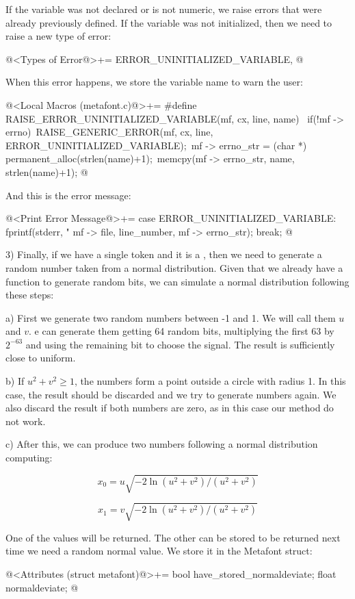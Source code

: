 If the variable was not declared or is not numeric, we raise errors
that were already previously defined. If the variable was not
initialized, then we need to raise a new type of error:

\iniciocodigo
@<Types of Error@>+=
ERROR_UNINITIALIZED_VARIABLE,
@
\fimcodigo

When this error happens, we store the variable name to warn the user:

\iniciocodigo
@<Local Macros (metafont.c)@>+=
#define RAISE_ERROR_UNINITIALIZED_VARIABLE(mf, cx, line, name) {\
  if(!mf -> errno){\
    RAISE_GENERIC_ERROR(mf, cx, line, ERROR_UNINITIALIZED_VARIABLE);\
    mf -> errno_str = (char *) permanent_alloc(strlen(name)+1);\
    memcpy(mf -> errno_str, name, strlen(name)+1);}}
@
\fimcodigo

And this is the error message:

\iniciocodigo
@<Print Error Message@>+=
case ERROR_UNINITIALIZED_VARIABLE:
  fprintf(stderr, "%
          mf -> file, line_number, mf -> errno_str);
  break;
@
\fimcodigo

3) Finally, if we have a single token and it is
a , then we need to generate a random number
taken from a normal distribution. Given that we already have a
function to generate random bits, we can simulate a normal
distribution following these steps:

a) First we generate two random numbers between -1 and 1. We will call
them $u$ and $v$. e can generate them getting 64 random bits,
multiplying the first 63 by $2^{-63}$ and using the remaining bit to
choose the signal. The result is sufficiently close to uniform.

b) If $u^2+v^2\geq 1$, the numbers form a point outside a circle with
radius 1. In this case, the result should be discarded and we try to
generate numbers again. We also discard the result if both numbers are
zero, as in this case our method do not work.

c) After this, we can produce two numbers following a normal
distribution computing:

$$
x_0 = u\sqrt{-2\ln(u^2+v^2)/(u^2+v^2)}
$$

$$
x_1 = v\sqrt{-2\ln(u^2+v^2)/(u^2+v^2)}
$$

One of the values will be returned. The other can be stored to be
returned next time we need a random normal value. We store it in the
Metafont struct:

\iniciocodigo
@<Attributes (struct metafont)@>+=
  bool have_stored_normaldeviate;
  float normaldeviate;
@
\fimcodigo

